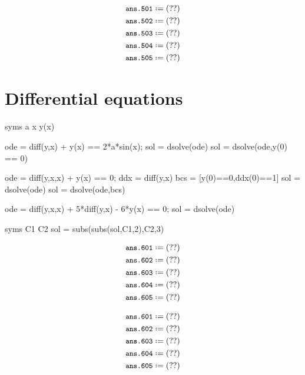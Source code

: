 \documentclass[12pt]{matlatex}
\begin{document}
\begin{align*}
   &\mat*{ans.501}\\
   &\mat*{ans.502}\\
   &\mat*{ans.503}\\
   &\mat*{ans.504}\\
   &\mat*{ans.505}
\end{align*}

\clearpage

\section*{Differential equations}

\begin{minipage}[t]{0.65\textwidth}
\begin{matlab}
   syms a x y(x)

   ode = diff(y,x) + y(x) == 2*a*sin(x);
   sol = dsolve(ode)                               %
   sol = dsolve(ode,y(0) == 0)                     %

   ode = diff(y,x,x) + y(x) == 0;
   ddx = diff(y,x)
   bcs = [y(0)==0,ddx(0)==1]
   sol = dsolve(ode)                               %
   sol = dsolve(ode,bcs)                           %

   ode = diff(y,x,x) + 5*diff(y,x) - 6*y(x) == 0;
   sol = dsolve(ode)                               %

   syms C1 C2
   sol = subs(subs(sol,C1,2),C2,3)                 %
\end{matlab}
\end{minipage}
\hskip 1cm
\begin{minipage}[t]{0.35\textwidth}
\begin{latex}
   \begin{align*}
      &\mat*{ans.601}\\
      &\mat*{ans.602}\\
      &\mat*{ans.603}\\
      &\mat*{ans.604}\\
      &\mat*{ans.605}
   \end{align*}
\end{latex}
\end{minipage}

\begin{align*}
   &\mat*{ans.601}\\
   &\mat*{ans.602}\\
   &\mat*{ans.603}\\
   &\mat*{ans.604}\\
   &\mat*{ans.605}
\end{align*}
\end{document}
